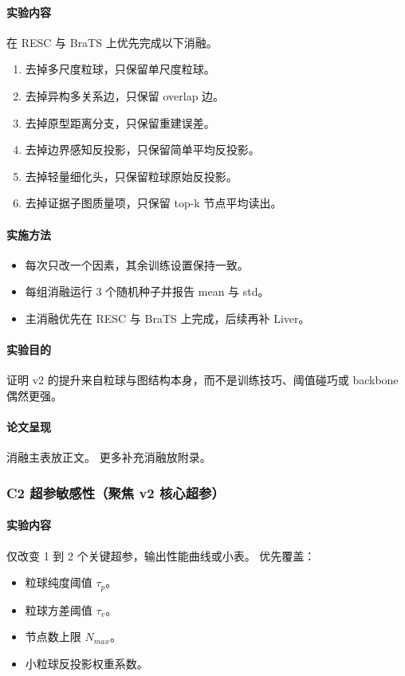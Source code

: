 \documentclass[UTF8,a4paper]{ctexart}
\begin{document}
\paragraph{实验内容}
在 RESC 与 BraTS 上优先完成以下消融。
\begin{enumerate}
  \item 去掉多尺度粒球，只保留单尺度粒球。
  \item 去掉异构多关系边，只保留 overlap 边。
  \item 去掉原型距离分支，只保留重建误差。
  \item 去掉边界感知反投影，只保留简单平均反投影。
  \item 去掉轻量细化头，只保留粒球原始反投影。
  \item 去掉证据子图质量项，只保留 top-k 节点平均读出。
\end{enumerate}

\paragraph{实施方法}
\begin{itemize}
  \item 每次只改一个因素，其余训练设置保持一致。
  \item 每组消融运行 3 个随机种子并报告 mean 与 std。
  \item 主消融优先在 RESC 与 BraTS 上完成，后续再补 Liver。
\end{itemize}

\paragraph{实验目的}
证明 v2 的提升来自粒球与图结构本身，而不是训练技巧、阈值碰巧或 backbone 偶然更强。

\paragraph{论文呈现}
消融主表放正文。
更多补充消融放附录。

\subsubsection{C2 超参敏感性（聚焦 v2 核心超参）}

\paragraph{实验内容}
仅改变 1 到 2 个关键超参，输出性能曲线或小表。
优先覆盖：
\begin{itemize}
  \item 粒球纯度阈值 $\tau_p$。
  \item 粒球方差阈值 $\tau_v$。
  \item 节点数上限 $N_{max}$。
  \item 小粒球反投影权重系数。
\end{itemize}
\end{document}
